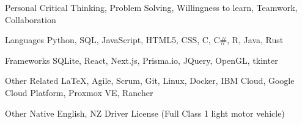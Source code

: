 

\begin{cvskills}

  \cvskill
    {Personal} %
    {Critical Thinking, Problem Solving, Willingness to learn, Teamwork, Collaboration} %

  \cvskill
    {Languages} %
    {Python, SQL, JavaScript, HTML5, CSS, C, C\#, R, Java, Rust} %

  \cvskill
    {Frameworks} %
    {SQLite, React, Next.js, Prisma.io, JQuery, OpenGL, tkinter} %

  \cvskill
    {Other Related} %
    {LaTeX, Agile, Scrum, Git, Linux, Docker, IBM Cloud, Google Cloud Platform, Proxmox VE, Rancher} %

  \cvskill
    {Other} %
    {Native English, NZ Driver License (Full Class 1 light motor vehicle)} %


\end{cvskills}
